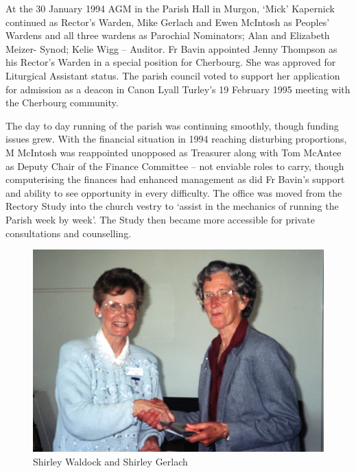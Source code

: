 At the 30 January 1994 AGM in the Parish Hall in Murgon, `Mick' Kapernick continued as Rector's Warden, Mike Gerlach and Ewen McIntosh as Peoples' Wardens and all three wardens as Parochial Nominators; Alan and Elizabeth Meizer- Synod; Kelie Wigg -- Auditor. Fr Bavin appointed Jenny Thompson as his Rector's Warden in a special position for Cherbourg. She was approved for Liturgical Assistant status. The parish council voted to support her application for admission as a deacon in Canon Lyall Turley's 19 February 1995 meeting with the Cherbourg community.



The day to day running of the parish was continuing smoothly, though funding issues grew. With the financial situation in 1994 reaching disturbing proportions, M McIntosh was reappointed unopposed as Treasurer along with Tom McAntee as Deputy Chair of the Finance Committee -- not enviable roles to carry, though computerising the finances had enhanced management as did Fr Bavin's support and ability to see opportunity in every difficulty. The office was moved from the Rectory Study into the church vestry to `assist in the mechanics of running the Parish week by week'. The Study then became more accessible for private consultations and counselling.









\begin{figure}
\begin{center}
\includegraphics[width=1.\linewidth,center]{../images/waldockGerlach.jpg}
\caption{Shirley Waldock and Shirley Gerlach}
\end{center}
\end{figure}




